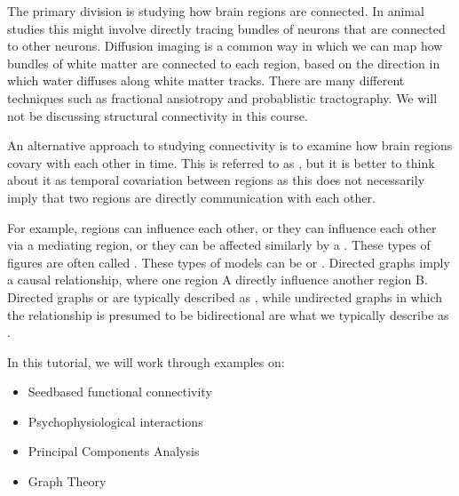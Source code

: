 \documentclass[letterpaper,10pt,english]{sphinxmanual}
\begin{document}
The primary division is studying how brain regions are  connected. In animal studies this might involve directly tracing bundles of neurons that are connected to other neurons. Diffusion imaging is a common way in which we can map how bundles of white matter are connected to each region, based on the direction in which water diffuses along white matter tracks. There are many different techniques such as fractional ansiotropy and probablistic tractography. We will not be discussing structural connectivity in this course.

An alternative approach to studying connectivity is to examine how brain regions covary with each other in time. This is referred to as , but it is better to think about it as temporal covariation between regions as this does not necessarily imply that two regions are directly communication with each other.


For example, regions can  influence each other, or they can  influence each other via a mediating region, or they can be affected similarly by a . These types of figures are often called . These types of  models can be  or . Directed graphs imply a causal relationship, where one region A directly influence another region B. Directed graphs or  are typically described as , while undirected graphs in which the relationship is presumed to be bidirectional are what we typically describe as .

In this tutorial, we will work through examples on:
\begin{itemize}
\item {} 
Seed\sphinxhyphen{}based functional connectivity

\item {} 
Psychophysiological interactions

\item {} 
Principal Components Analysis

\item {} 
Graph Theory

\end{itemize}
\end{document}
